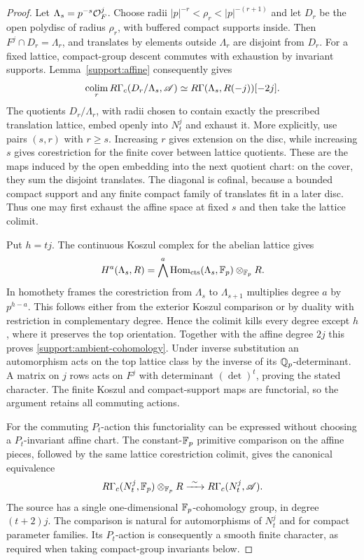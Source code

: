 \begin{proof}
Let $\Lambda_s=p^{-s}\mathcal O_F^j$.  Choose radii
$|p|^{-r}<\rho_r<|p|^{-(r+1)}$ and let $D_r$ be the open
polydisc of radius $\rho_r$, with buffered compact supports inside.
Then $F^j\cap D_r=\Lambda_r$, and translates by elements outside
$\Lambda_r$ are disjoint from $D_r$.  For a fixed
lattice, compact-group descent commutes with exhaustion by
invariant supports.  Lemma~\ref{support:affine} consequently gives
\[
 \operatorname*{colim}_rR\Gamma_c(D_r/\Lambda_s,\mathscr A)
 \simeq
 R\Gamma(\Lambda_s,R(-j))[-2j].
\]
The quotients $D_r/\Lambda_r$, with radii chosen to contain exactly
the prescribed translation lattice, embed openly into $N_t^j$
and exhaust it.  More explicitly, use pairs $(s,r)$ with $r\geq s$.
Increasing $r$ gives extension on the disc, while increasing $s$
gives corestriction for the finite cover between lattice quotients.
These are the maps induced by the open embedding into the next
quotient chart: on the cover, they sum the disjoint translates.
The diagonal is cofinal, because a bounded compact support and
any finite compact family of translates fit in a later disc.
Thus one may first exhaust the affine space at fixed $s$ and then
take the lattice colimit.

Put $h=tj$.  The continuous Koszul complex for the abelian lattice
gives
\[
 H^a(\Lambda_s,R)=
 \bigwedge^a\operatorname{Hom}_{\mathrm{cts}}(\Lambda_s,\mathbb F_p)\otimes_{\mathbb F_p}R.
\]
In homothety frames the corestriction from $\Lambda_s$ to
$\Lambda_{s+1}$ multiplies degree $a$ by $p^{h-a}$.  This follows
either from the exterior Koszul comparison or by duality with
restriction in complementary degree.  Hence the colimit kills
every degree except $h$, where it preserves the top orientation.
Together with the affine degree $2j$ this proves
\eqref{support:ambient-cohomology}.  Under inverse substitution an
automorphism acts on the top lattice class by the inverse of its
$\mathbb Q_p$-determinant.  A matrix on $j$ rows acts on $F^j$ with
determinant $(\det)^t$, proving the stated character.  The finite
Koszul and compact-support maps are functorial, so the argument
retains all commuting actions.

For the commuting $P_t$-action this functoriality can be expressed
without choosing a $P_t$-invariant affine chart.  The constant-$\mathbb F_p$
primitive comparison on the affine pieces, followed by the same
lattice corestriction colimit, gives the canonical equivalence
\[
 R\Gamma_c(N_t^j,\mathbb F_p)\otimes_{\mathbb F_p}R
       \xrightarrow{\ \sim\ }R\Gamma_c(N_t^j,\mathscr A).
\]
The source has a single one-dimensional $\mathbb F_p$-cohomology group,
in degree $(t+2)j$.  The comparison is natural for automorphisms
of $N_t^j$ and for compact parameter families.  Its $P_t$-action
is consequently a smooth finite character, as required when
taking compact-group invariants below.
\end{proof}


